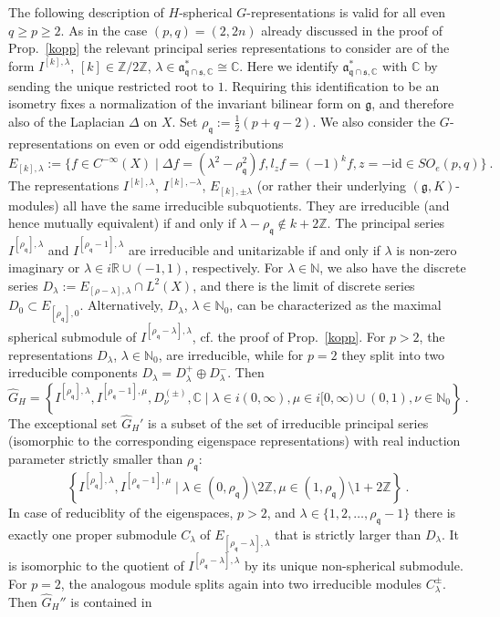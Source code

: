 \documentclass[10]{amsart}
\theoremstyle{remark}
\theoremstyle{definition}
\numberwithin{equation}{section}
\newcommand{\R}{\mathbb{R}}           %
\newcommand{\C}{\mathbb{C}}           %
\newcommand{\N}{\mathbb{N}}           %
\newcommand{\Z}{\mathbb{Z}}         %
\newcommand{\id}{\mathrm{id}}
\newcommand{\fa}{{\mathfrak a}}             %
\newcommand{\fg}{{\mathfrak g}}
\newcommand{\fq}{{\mathfrak q}}
\newcommand{\fs}{{\mathfrak s}}
\begin{document}
{The following description of $H$-spherical $G$-representations is valid for all even $q\ge p\ge 2$.  As in the case $(p,q)=(2,2n)$ already discussed in the proof of Prop.~\ref{kopp} the relevant principal series
representations to consider are of the form $I^{[k],\lambda}$, $[k]\in\Z/2\Z$, $\lambda\in \fa_{\fq\cap\fs,\C}^*\cong\C$. Here we identify $\fa_{\fq\cap\fs,\C}^*$ with $\C$
by sending the unique restricted root to $1$. Requiring this identification to be an isometry fixes a normalization of the invariant bilinear form on $\fg$, and therefore also of the Laplacian 
$\Delta$ on $X$. Set $\rho_\fq:=\frac{1}{2}(p+q-2)$. We also consider the $G$-representations on even or odd eigendistributions
$$ E_{[k],\lambda}:=\{f\in C^{-\infty}(X)\mid \Delta f=(\lambda^2-\rho_\fq^2) f,  l_zf=(-1)^k f, z=-\id\in SO_e(p,q)\}\ .$$
The representations $I^{[k],\lambda}$, $I^{[k],-\lambda}$,  $E_{[k],\pm\lambda}$ (or rather their underlying $(\fg,K)$-modules) all have the same irreducible subquotients. They
are irreducible (and hence mutually equivalent) if and only if $\lambda-\rho_\fq\not\in k+2\Z$. The principal series $I^{[\rho_\fq],\lambda}$ and $I^{[\rho_\fq-1],\lambda}$ are irreducible and unitarizable
if and only if $\lambda$ is non-zero imaginary or $\lambda\in i\R\cup (-1,1)$, respectively. For $\lambda\in\N$, we also have the discrete series
$ D_\lambda:= E_{[\rho-\lambda],\lambda}\cap L^2(X)$, and there is the limit of discrete series $D_0\subset  E_{[\rho_\fq],0}$. Alternatively, $D_\lambda$, $\lambda\in\N_0$, can be characterized as the maximal spherical submodule of $I^{[\rho_\fq-\lambda],\lambda}$, cf. the proof of Prop.~\ref{kopp}. For $p>2$, the representations $D_\lambda$, $\lambda\in\N_0$, are irreducible,
while for $p=2$ they split into two irreducible components $D_\lambda=D_\lambda^+\oplus D_\lambda^-$. Then
$$ \widehat G_H=\left\{I^{[\rho_\fq],\lambda},I^{[\rho_\fq-1],\mu}, D_\nu^{(\pm)},\C\mid \lambda\in i(0,\infty),\mu\in i[0,\infty)\cup (0,1), \nu\in\N_0\right\}\ .$$
The exceptional set $\widehat G_H'$ is a subset of the set of irreducible principal series (isomorphic to the corresponding eigenspace representations) with real induction parameter
strictly smaller than $\rho_\fq$: 
$$\left\{I^{[\rho_\fq],\lambda}, I^{[\rho_\fq-1],\mu}\mid \lambda\in (0,\rho_\fq)\setminus 2\Z,\mu\in (1,\rho_\fq)\setminus 1+2\Z\right\}\ .$$
In case of reduciblity of the eigenspaces, $p>2$, and $\lambda\in \{1,2,\dots,\rho_\fq-1\}$ there is exactly one proper submodule $C_\lambda$ of $E_{[\rho_\fq-\lambda],\lambda}$ that is strictly larger 
than $D_\lambda$. It is isomorphic to the quotient of $I^{[\rho_\fq-\lambda],\lambda}$ by its unique non-spherical submodule. For $p=2$, the analogous module splits again into two irreducible modules $C_\lambda^\pm$. Then $\widehat G_H''$ is contained in 
}
\end{document}
